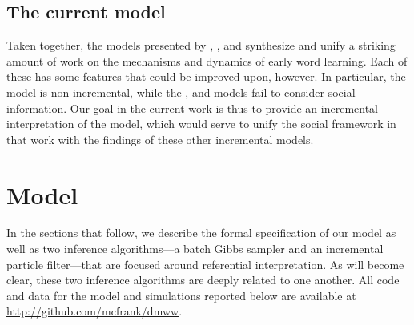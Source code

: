 \documentclass[man,noapacite,12pt]{apa2}
\begin{document}
\subsection{The current model}

Taken together, the models presented by , , and  synthesize and unify a striking amount of work on the mechanisms and dynamics of early word learning. Each of these has some features that could be improved upon, however. In particular, the  model is non-incremental, while the , and  models fail to consider social information. Our goal in the current work is thus to provide an incremental interpretation of the  model, which would serve to unify the social framework in that work with the findings of these other incremental models.

\section{Model}


In the sections that follow, we describe the formal specification of our model as well as two inference algorithms---a batch Gibbs sampler and an incremental particle filter---that are focused around referential interpretation. As will become clear, these two inference algorithms are deeply related to one another. All code and data for the model and simulations reported below are available at \url{http://github.com/mcfrank/dmww}. 


%
%
\end{document}
